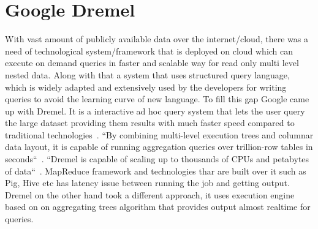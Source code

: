 \section{Google Dremel}


With vast amount of publicly available data over the internet/cloud, 
there was a need of technological system/framework that is deployed on 
cloud which can execute on demand queries in faster and scalable way 
for read only multi level nested data. Along with that a system that 
uses structured query language, which is widely adapted and extensively 
used by the developers for writing queries to avoid the learning curve of 
new language. To fill this gap Google came up with Dremel. It is a 
interactive ad hoc query system that lets the user query the large 
dataset providing them results with much faster speed compared to 
traditional technologies~\cite{hid-sp18-523-www-dremel}. ``By combining 
multi-level execution trees and columnar data layout, it is capable of 
running aggregation queries over trillion-row tables in 
seconds``~\cite{hid-sp18-523-www-dremel}. ``Dremel is capable of scaling 
up to thousands of CPUs and petabytes of data``~\cite{hid-sp18-523-www-dremel}.
MapReduce framework and technologies thar are built over it such as Pig, Hive 
etc has latency issue between running the job and getting output. 
Dremel on the other hand took a different approach, it uses execution engine
based on on aggregating trees algorithm that provides output almost realtime 
for queries.
